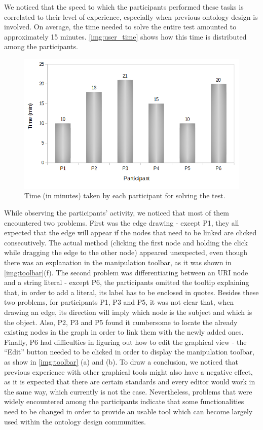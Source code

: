 We noticed that the speed to which the participants performed these tasks is correlated to their level of experience, especially when previous ontology design is involved. On average, the time needed to solve the entire test amounted to approximately 15 minutes. \autoref{img:user_time} shows how this time is distributed among the participants.

\begin{figure}[htb]
	\centering
  	\centerline{\includegraphics[width = \textwidth]{img/user_time.png}}
	\caption{Time (in minutes) taken by each participant for solving the test.}
	\label{img:user_time}
\end{figure}

While observing the participants' activity, we noticed that most of them encountered two problems. First was the edge drawing - except P1, they all expected that the edge will appear if the nodes that need to be linked are clicked consecutively. The actual method (clicking the first node and holding the click while dragging the edge to the other node) appeared unexpected, even though there was an explanation in the manipulation toolbar, as it was shown in \autoref{img:toolbar}(f). The second problem was differentiating between an URI node and a string literal - except P6, the participants omitted the tooltip explaining that, in order to add a literal, its label has to be enclosed in quotes. Besides these two problems, for participants P1, P3 and P5, it was not clear that, when drawing an edge, its direction will imply which node is the subject and which is the object. Also,  P2, P3 and P5 found it cumbersome to locate the already existing nodes in the graph in order to link them with the newly added ones. Finally, P6 had difficulties in figuring out how to edit the graphical view - the ``Edit'' button needed to be clicked in order to display the manipulation toolbar, as show in \autoref{img:toolbar} (a) and (b). To draw a conclusion, we noticed that previous experience with other graphical tools might also have a negative effect, as it is expected that there are certain standards and every editor would work in the same way, which currently is not the case. Nevertheless, problems that were widely encountered among the participants indicate that some functionalities need to be changed in order to provide an usable tool which can become largely used within the ontology design communities.

